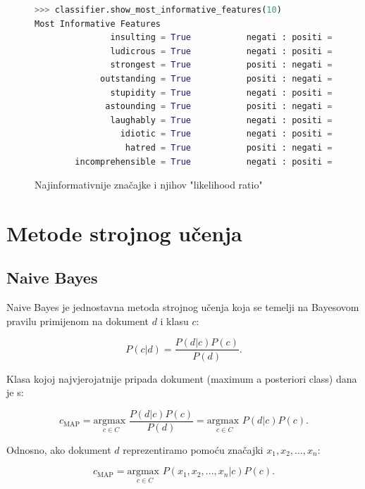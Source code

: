 \documentclass[conference]{IEEEtran}
\begin{document}
\begin{figure}[H]
\begin{minipage}{0.5\textwidth}
\centering
\begin{lstlisting}[language = Python, frame = single, basicstyle=\tiny\ttfamily, xleftmargin = 5pt, xrightmargin = 5pt]
>>> classifier.show_most_informative_features(10)
Most Informative Features
               insulting = True           negati : positi =     16.9 : 1.0
               ludicrous = True           negati : positi =     12.5 : 1.0
               strongest = True           positi : negati =     11.8 : 1.0
             outstanding = True           positi : negati =     11.5 : 1.0
               stupidity = True           negati : positi =     11.3 : 1.0
              astounding = True           positi : negati =     11.1 : 1.0
               laughably = True           negati : positi =     10.9 : 1.0
                 idiotic = True           negati : positi =     10.5 : 1.0
                  hatred = True           positi : negati =     10.4 : 1.0
        incomprehensible = True           negati : positi =      8.9 : 1.0
\end{lstlisting}
\caption{Najinformativnije značajke i njihov "likelihood ratio"}
\end{minipage}
\end{figure}

\section{Metode strojnog učenja}

\subsection{Naive Bayes}

Naive Bayes je jednostavna metoda strojnog učenja koja se temelji na Bayesovom pravilu primijenom na dokument $d$ i klasu $c$:

\[P(c|d) = \frac{P(d|c)P(c)}{P(d)}.\]

Klasa kojoj najvjerojatnije pripada dokument (maximum a posteriori class) dana je s:

\[c_{\text{MAP}} = \underset{{c \in C}}{\text{argmax }} \frac{P(d|c)P(c)}{P(d)}
= \underset{{c \in C}}{\text{argmax }} P(d|c)P(c).\] 

Odnosno, ako dokument $d$ reprezentiramo pomoću značajki $x_1, x_2, \ldots, x_n$:

\[c_{\text{MAP}} = \underset{{c \in C}}{\text{argmax }} P(x_1, x_2, \ldots, x_n|c)P(c).\]
\end{document}
